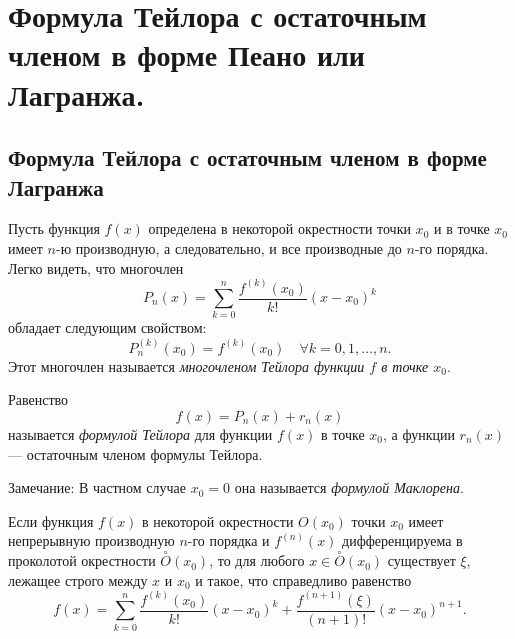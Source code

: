 \chapter{Формула Тейлора с остаточным членом в форме Пеано или Лагранжа.}
\section{Формула Тейлора с остаточным членом в форме Лагранжа}

Пусть функция $f(x)$ определена в некоторой окрестности точки $x_0$ и в точке $x_0$ имеет $n$-ю производную, а следовательно, и все производные до $n$-го порядка. Легко видеть, что многочлен
$$
P_n(x) = \sum_{k = 0}^{n} \frac{f^{(k)}(x_0)}{k!} (x - x_0)^k
$$
обладает следующим свойством:
$$
P_n^{(k)}(x_0) = f^{(k)}(x_0) \quad \forall k = 0,1,\ldots,n.
$$
Этот многочлен называется \textit{многочленом Тейлора функции $f$ в точке $x_0$}.

Равенство $$f(x) = P_n(x) + r_n(x)$$ называется \textit{формулой Тейлора} для функции $f(x)$ в точке $x_0$, а функции $r_n(x)$ --- остаточным членом формулы Тейлора.

Замечание: В частном случае $x_0=0$ она называется \textit{формулой Маклорена}.

\begin{thm}
Если функция $f(x)$ в некоторой окрестности $O(x_0)$ точки $x_0$ имеет непрерывную производную $n$-го порядка и $f^{(n)}(x)$ дифференцируема в проколотой окрестности $\overset{\circ}{O}(x_0)$, то для любого
$x \in \overset{\circ}{O}(x_0)$ существует $\xi$, лежащее строго между $x$ и $x_0$ и такое, что справедливо равенство
\begin{equation} \label{ch5.1eq1}
f(x) = \sum_{k = 0}^{n} \frac{f^{(k)}(x_0)}{k!}(x - x_0)^k + \frac{f^{(n + 1)}(\xi)}{(n + 1)!}(x - x_0)^{n + 1}.
\end{equation}
\end{thm}

